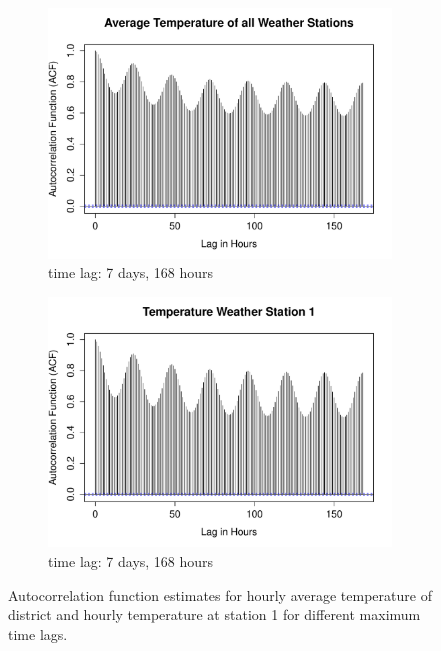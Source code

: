 \documentclass[conference]{IEEEtran}
\begin{document}
\begin{figure}[!ht]
\centering
\begin{subfigure}[b]{.49\linewidth}
\includegraphics[width=\linewidth]{gfx/acf_avg_temp_7days.pdf}
\caption{time lag: 7 days, 168 hours}
\label{subfig:avg-temp-7days}
\end{subfigure}
\begin{subfigure}[b]{.49\linewidth}
\includegraphics[width=\linewidth]{gfx/acf_temp_station1_7days.pdf}
\caption{time lag: 7 days, 168 hours}
\label{subfig:temp-station1-7days}
\end{subfigure}
\caption{Autocorrelation function estimates for hourly average temperature of district and hourly temperature at station 1 for different maximum time lags.}
\label{fig:temp-lags}
\end{figure}
\end{document}

